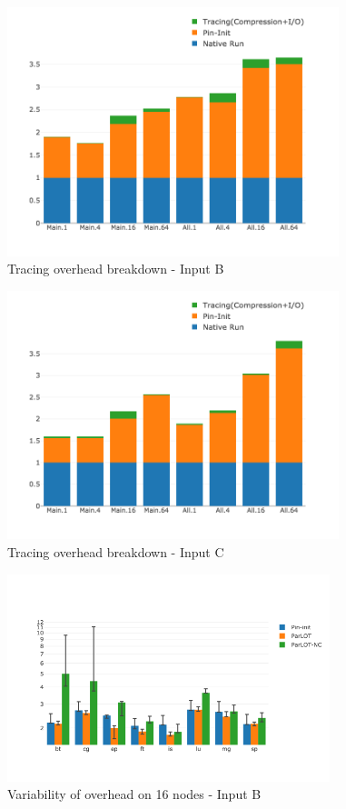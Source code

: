 



\begin{figure}[t]
\centering
\includegraphics[width=3.8in]{figs.comet.newMed/comet_chartDet_B_wc_byTool_p3_5.png}
\caption{ Tracing overhead breakdown - Input B}
\label{comet_chartDet_B_wc_byTool_p3_5}
\end{figure}


\begin{figure}[t]
\centering
\includegraphics[width=3.8in]{figs.comet.newMed/comet_chartDet_C_wc_byTool_p3_5.png}
\caption{ Tracing overhead breakdown - Input C}
\label{comet_chartDet_C_wc_byTool_p3_5}
\end{figure}



\begin{figure}[t]
\centering
\includegraphics[width=3.7in]{figs.comet.newMed/comet_BX2_Main_16_B_p3_5.png}
\caption{ Variability of \parlotm overhead on 16 nodes - Input B}
\label{comet_BX2_Main_16_B_p3_5}
\end{figure}


